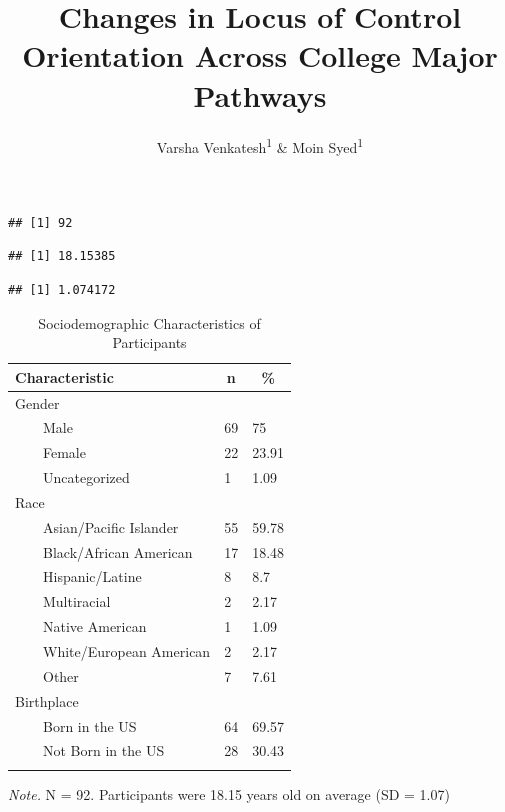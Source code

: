 \documentclass[
  english,
  man,floatsintext]{apa6}
\title{Changes in Locus of Control Orientation Across College Major Pathways}
\author{Varsha Venkatesh\textsuperscript{1} \& Moin Syed\textsuperscript{1}}
\date{}
\affiliation{\vspace{0.5cm}\textsuperscript{1} University of Minnesota}
\begin{document}
\maketitle

\begin{verbatim}
## [1] 92
\end{verbatim}

\begin{verbatim}
## [1] 18.15385
\end{verbatim}

\begin{verbatim}
## [1] 1.074172
\end{verbatim}

\begin{table}[tbp]

\begin{center}
\begin{threeparttable}

\caption{\label{tab:descriptive table}Sociodemographic Characteristics of Participants}

\begin{tabular}{lll}
\toprule
Characteristic & \multicolumn{1}{c}{n} & \multicolumn{1}{c}{\%}\\
\midrule
Gender &  & \\
\ \ \ \  Male & 69 & 75\\
\ \ \ \  Female & 22 & 23.91\\
\ \ \ \  Uncategorized & 1 & 1.09\\
Race &  & \\
\ \ \ \  Asian/Pacific Islander & 55 & 59.78\\
\ \ \ \  Black/African American & 17 & 18.48\\
\ \ \ \  Hispanic/Latine & 8 & 8.7\\
\ \ \ \  Multiracial & 2 & 2.17\\
\ \ \ \  Native American & 1 & 1.09\\
\ \ \ \  White/European American & 2 & 2.17\\
\ \ \ \  Other & 7 & 7.61\\
Birthplace &  & \\
\ \ \ \  Born in the US & 64 & 69.57\\
\ \ \ \  Not Born in the US & 28 & 30.43\\
\bottomrule
\addlinespace
\end{tabular}

\begin{tablenotes}[para]
\normalsize{\textit{Note.} N = 92. Participants were 18.15 years old on average (SD = 1.07)}
\end{tablenotes}

\end{threeparttable}
\end{center}

\end{table}
\end{document}
